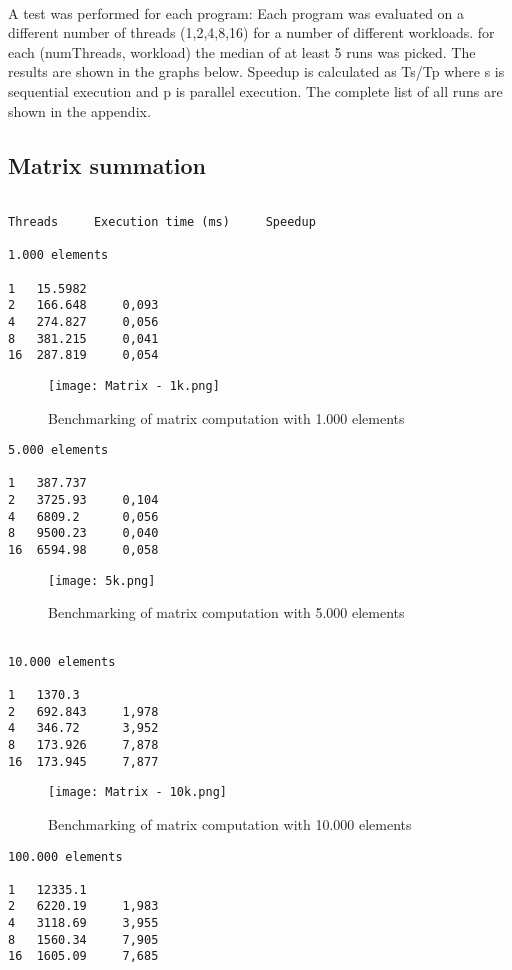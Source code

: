 \documentclass{article}
\begin{document}
A test was performed for each program: Each program was evaluated on a different number of threads (1,2,4,8,16) for a number of different workloads. for each (numThreads, workload) the median of at least 5 runs was picked. The results are shown in the graphs below. Speedup is calculated as Ts/Tp where s is sequential execution and p is parallel execution. The complete list of all runs are shown in the appendix.

\subsection{Matrix summation}
\begin{verbatim}

Threads     Execution time (ms)     Speedup

1.000 elements 

1   15.5982 	 	     
2   166.648     0,093       
4   274.827     0,056
8   381.215     0,041
16  287.819     0,054
\end{verbatim}
\begin{figure}[h]
\centering
\texttt{[image: Matrix - 1k.png]}
\caption{Benchmarking of matrix computation with 1.000 elements}
\end{figure}      

\clearpage

\begin{verbatim}
5.000 elements

1   387.737	   
2   3725.93     0,104
4   6809.2      0,056    
8   9500.23     0,040   
16  6594.98     0,058   
\end{verbatim}

\begin{figure}[h]
\centering
\texttt{[image: 5k.png]}
\caption{Benchmarking of matrix computation with 5.000 elements}
\end{figure}      
\clearpage

\begin{verbatim}

10.000 elements

1   1370.3   
2   692.843     1,978
4   346.72      3,952   
8   173.926     7,878  
16  173.945     7,877
\end{verbatim}
\begin{figure}[h]
\centering
\texttt{[image: Matrix - 10k.png]}
\caption{Benchmarking of matrix computation with 10.000 elements}
\end{figure}      
\clearpage
\begin{verbatim}
100.000 elements

1   12335.1		       
2   6220.19     1,983       
4   3118.69     3,955      
8   1560.34     7,905       
16  1605.09     7,685      
\end{verbatim}
\end{document}
